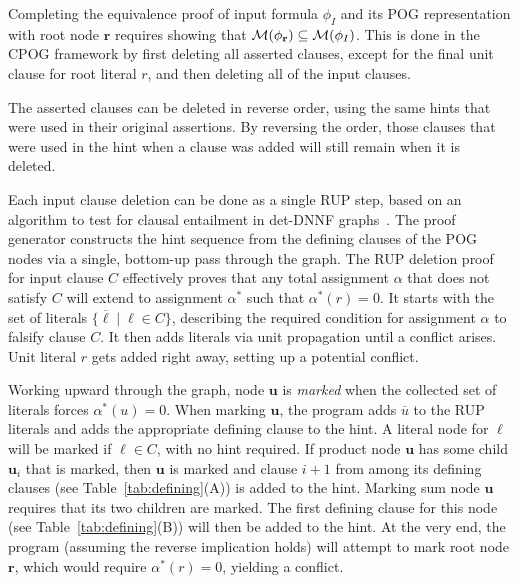 \documentclass[twoside,11pt]{article}
\newcommand{\obar}[1]{\overline{#1}}
\newcommand{\lit}{\ell}
\newcommand{\imply}{\Rightarrow}
\newcommand{\extend}[1]{#1^{*}}
\newcommand{\assign}{\alpha}
\newcommand{\eassign}{\extend{\alpha}}
\newcommand{\modelset}{{\cal M}}
\newcommand{\inputformula}{\phi_I}
\newcommand{\makenode}[1]{\mathbf{#1}}
\newcommand{\nodeu}{\makenode{u}}
\newcommand{\noder}{\makenode{r}}
\begin{document}
Completing the equivalence proof of input formula $\inputformula$ and its POG
representation with root node $\noder$ requires showing that
$\modelset(\phi_\noder) \subseteq \modelset(\inputformula)$.  This is done in the
CPOG framework by first deleting all asserted clauses, except for the
final unit clause for root literal $r$, and then deleting all of the
input clauses.

The asserted clauses can be deleted in reverse order, using the same
hints that were used in their original assertions.  By reversing the
order, those clauses that were used in the hint when a clause was
added will still remain when it is deleted.

Each input clause deletion can be done as a single RUP step, based
on an algorithm to test for clausal entailment in det-DNNF graphs~\cite{darwiche:jair:2002,capelli:sat:2019}.  The
proof generator constructs the hint sequence from the defining
clauses of the POG nodes via a single, bottom-up pass through the
graph.  The RUP deletion proof for input clause $C$ effectively proves that any
total assignment $\assign$ that does not
satisfy $C$ will extend to assignment $\eassign$ such that
$\eassign(r) = 0$.  It starts with the set of literals
$\{ \obar{\lit} \mid \lit \in C\}$, describing the required condition for
assignment $\assign$ to falsify clause $C$.
It then
adds literals via unit propagation until a
conflict arises.    Unit literal $r$ gets
added right away, setting up a potential conflict.

Working upward through the graph, node $\nodeu$ is \emph{marked} when
the collected set of literals forces $\eassign(u) = 0$.  When marking $\nodeu$, the
program adds $\obar{u}$ to the RUP literals and adds the appropriate
defining clause to the hint.  A literal node for
$\lit$ will be marked if $\lit \in C$, with no hint required.  If
product node $\nodeu$ has some child $\nodeu_i$ that is marked, then
$\nodeu$ is marked and clause $i+1$ from among its defining clauses (see Table~\ref{tab:defining}(A)) is
added to the hint.  Marking sum node $\nodeu$ requires that its two children are marked.
The first defining
clause for this node (see Table~\ref{tab:defining}(B)) will then be added to the hint.  At the very end, the program
(assuming the reverse implication holds) will attempt to mark root
node $\noder$, which would require $\eassign(r) = 0$, yielding a
conflict.
\end{document}
